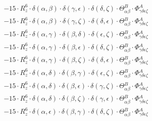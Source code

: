 \documentclass{article}
\begin{document}
\begin{equation}
\begin{array}{c}
 \\[0.2em] 		 - 15 \cdot R_{z}^{6} \cdot \delta{}\left(\alpha{}, \beta{}\right) \cdot \delta{}\left(\gamma{}, \epsilon{}\right) \cdot \delta{}\left(\delta{}, \zeta{}\right) \cdot \Theta{}^{B}_{\alpha{}\beta{}} \cdot \Phi{}^{A}_{\gamma{}\delta{}\epsilon{}\zeta{}} 
 \\[0.2em] 		 - 15 \cdot R_{z}^{6} \cdot \delta{}\left(\alpha{}, \beta{}\right) \cdot \delta{}\left(\gamma{}, \zeta{}\right) \cdot \delta{}\left(\delta{}, \epsilon{}\right) \cdot \Theta{}^{B}_{\alpha{}\beta{}} \cdot \Phi{}^{A}_{\gamma{}\delta{}\epsilon{}\zeta{}} 
 \\[0.2em] 		 - 15 \cdot R_{z}^{6} \cdot \delta{}\left(\alpha{}, \gamma{}\right) \cdot \delta{}\left(\beta{}, \delta{}\right) \cdot \delta{}\left(\epsilon{}, \zeta{}\right) \cdot \Theta{}^{B}_{\alpha{}\beta{}} \cdot \Phi{}^{A}_{\gamma{}\delta{}\epsilon{}\zeta{}} 
 \\[0.2em] 		 - 15 \cdot R_{z}^{6} \cdot \delta{}\left(\alpha{}, \gamma{}\right) \cdot \delta{}\left(\beta{}, \epsilon{}\right) \cdot \delta{}\left(\delta{}, \zeta{}\right) \cdot \Theta{}^{B}_{\alpha{}\beta{}} \cdot \Phi{}^{A}_{\gamma{}\delta{}\epsilon{}\zeta{}} 
 \\[0.2em] 		 - 15 \cdot R_{z}^{6} \cdot \delta{}\left(\alpha{}, \gamma{}\right) \cdot \delta{}\left(\beta{}, \zeta{}\right) \cdot \delta{}\left(\delta{}, \epsilon{}\right) \cdot \Theta{}^{B}_{\alpha{}\beta{}} \cdot \Phi{}^{A}_{\gamma{}\delta{}\epsilon{}\zeta{}} 
 \\[0.2em] 		 - 15 \cdot R_{z}^{6} \cdot \delta{}\left(\alpha{}, \delta{}\right) \cdot \delta{}\left(\beta{}, \gamma{}\right) \cdot \delta{}\left(\epsilon{}, \zeta{}\right) \cdot \Theta{}^{B}_{\alpha{}\beta{}} \cdot \Phi{}^{A}_{\gamma{}\delta{}\epsilon{}\zeta{}} 
 \\[0.2em] 		 - 15 \cdot R_{z}^{6} \cdot \delta{}\left(\alpha{}, \delta{}\right) \cdot \delta{}\left(\beta{}, \epsilon{}\right) \cdot \delta{}\left(\gamma{}, \zeta{}\right) \cdot \Theta{}^{B}_{\alpha{}\beta{}} \cdot \Phi{}^{A}_{\gamma{}\delta{}\epsilon{}\zeta{}} 
 \\[0.2em] 		 - 15 \cdot R_{z}^{6} \cdot \delta{}\left(\alpha{}, \delta{}\right) \cdot \delta{}\left(\beta{}, \zeta{}\right) \cdot \delta{}\left(\gamma{}, \epsilon{}\right) \cdot \Theta{}^{B}_{\alpha{}\beta{}} \cdot \Phi{}^{A}_{\gamma{}\delta{}\epsilon{}\zeta{}} 
 \\[0.2em] 		 - 15 \cdot R_{z}^{6} \cdot \delta{}\left(\alpha{}, \epsilon{}\right) \cdot \delta{}\left(\beta{}, \gamma{}\right) \cdot \delta{}\left(\delta{}, \zeta{}\right) \cdot \Theta{}^{B}_{\alpha{}\beta{}} \cdot \Phi{}^{A}_{\gamma{}\delta{}\epsilon{}\zeta{}} 

\end{array}
\end{equation}
\end{document}
